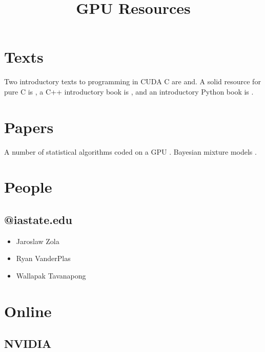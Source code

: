 \documentclass{article}
\title{GPU Resources}
\begin{document}
 

\section{Texts}

Two introductory texts to programming in CUDA C are \cite{sanders2010cuda} and\cite{kirk2010programming}. A solid resource for pure C is \cite{kernighan}, a C++ introductory book is \cite{Savitch}, and an introductory Python book is \cite{beazley}.

\section{Papers}

A number of statistical algorithms coded on a GPU \citep{lee2010utility}. Bayesian mixture models \citep{suchard2010understanding}.

\section{People}

\subsection{@iastate.edu}

\begin{itemize}
\item Jaroslaw Zola
\item Ryan VanderPlas
\item Wallapak Tavanapong
\end{itemize}

\section{Online}

\subsection{NVIDIA}
\end{document}
